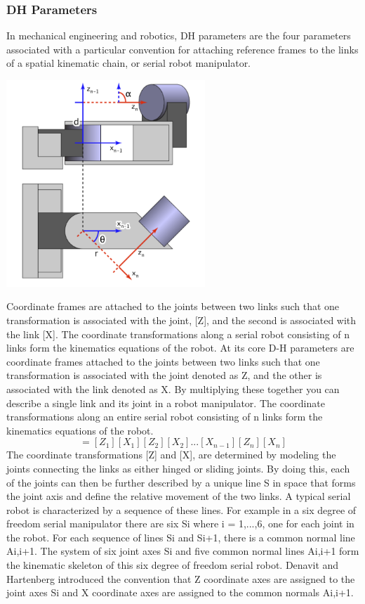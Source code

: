     \subsubsection{DH Parameters}
    In mechanical engineering and robotics, DH parameters are the four parameters associated with a particular convention for attaching reference frames to the links of a spatial kinematic chain, or serial robot manipulator.
    \begin{center}
    \includegraphics[width=75mm]{Dh.PNG}
    \end{center}
    Coordinate frames are attached to the joints between two links such that one transformation is associated with the joint, [Z], and the second is associated with the link [X]. The coordinate transformations along a serial robot consisting of n links form the kinematics equations of the robot. At its core D-H parameters are coordinate frames attached to the joints between two links such that one transformation is associated with the joint denoted as Z, and the other is associated with the link denoted as X. By multiplying these together you can describe a single link and its joint in a robot manipulator. The coordinate transformations along an entire serial robot consisting of n links form the kinematics equations of the robot.
    \begin{equation}
    [T] = [Z_1][X_1][Z_2][X_2]...[X_{n-1}][Z_n][X_n]
    \end{equation}
    The coordinate transformations [Z] and [X], are determined by modeling the joints connecting the links as either hinged or sliding joints. By doing this, each of the joints can then be further described by a unique line S in space that forms the joint axis and define the relative movement of the two links. A typical serial robot is characterized by a sequence of these lines. For example in a six degree of freedom serial manipulator there are six Si where i = 1,...,6, one for each joint in the robot. For each sequence of lines Si and Si+1, there is a common normal line Ai,i+1. The system of six joint axes Si and five common normal lines Ai,i+1 form the kinematic skeleton of this six degree of freedom serial robot. Denavit and Hartenberg introduced the convention that Z coordinate axes are assigned to the joint axes Si and X coordinate axes are assigned to the common normals Ai,i+1.

